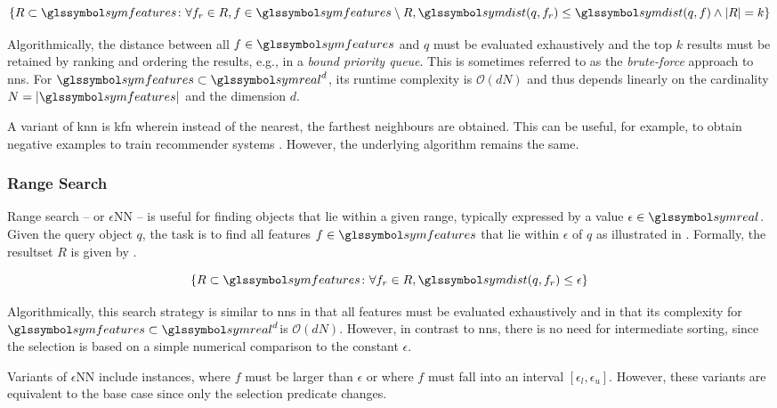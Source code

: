 \begin{equation}
    \label{eq:knn}
    \lbrace R \subset \symfeatures \colon \forall f_r \in R, f \in \symfeatures \setminus R, \symdist(q,f_r) \leq \symdist(q,f) \wedge |R| = k \rbrace
\end{equation}

Algorithmically, the distance between all $f \in \symfeatures$ and $q$ must be evaluated exhaustively and the top $k$ results must be retained by ranking and ordering the results, e.g., in a \emph{bound priority queue}. This is sometimes referred to as the \emph{brute-force} approach to \acrshort{nns}. For $\symfeatures \subset \symreal^d$, its runtime complexity is $\mathcal{O}(dN)$ and thus depends linearly on the cardinality $N = |\symfeatures|$ and the dimension $d$. 

A variant of \acrshort{knn} is \acrfull{kfn} wherein instead of the nearest, the farthest neighbours are obtained. This can be useful, for example, to obtain negative examples to train recommender systems \cite{Pagh:2015Approximate}. However, the underlying algorithm remains the same.

\subsubsection{Range Search}

Range search -- or $\epsilon$NN -- is useful for finding objects that lie within a given range, typically expressed by a value $\epsilon \in \symreal$. Given the query object $q$, the task is to find all features $f \in \symfeatures$ that lie within $\epsilon$ of $q$ as illustrated in . Formally, the resultset $R$ is given by .

\begin{equation}
    \label{eq:epsilonnn}
    \lbrace R \subset \symfeatures \colon \forall f_r \in R, \symdist(q,f_r) \leq \epsilon \rbrace
\end{equation}

Algorithmically, this search strategy is similar to \acrshort{nns} in that all features must be evaluated exhaustively and in that its complexity for $\symfeatures \subset \symreal^d$is $\mathcal{O}(dN)$. However, in contrast to \acrshort{nns}, there is no need for intermediate sorting, since the selection is based on a simple numerical comparison to the constant $\epsilon$.

Variants of $\epsilon$NN include instances, where $f$ must be larger than $\epsilon$ or where $f$ must fall into an interval $[ \epsilon_{l}, \epsilon_{u} ]$. However, these variants are equivalent to the base case since only the selection predicate changes.

